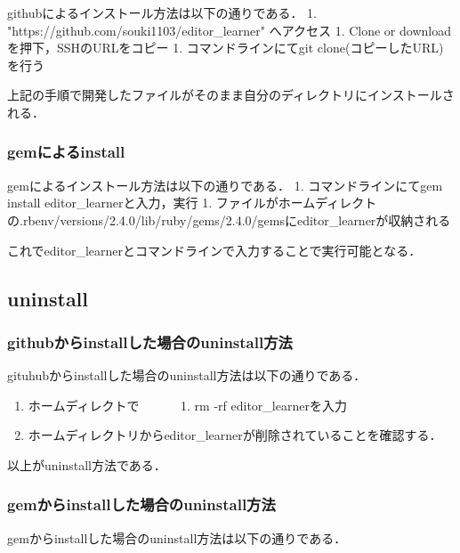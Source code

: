 \documentclass[11pt,dvipdfmx]{jsarticle}
\providecommand{\tightlist}{%
      \setlength{\itemsep}{0pt}\setlength{\parskip}{0pt}}
\begin{document}
githubによるインストール方法は以下の通りである． 1.
"https://github.com/souki1103/editor\_learner" へアクセス 1. Clone or
downloadを押下，SSHのURLをコピー 1. コマンドラインにてgit
clone(コピーしたURL)を行う

上記の手順で開発したファイルがそのまま自分のディレクトリにインストールされる．

\subsubsection{gemによるinstall}\label{gemux306bux3088ux308binstall}

gemによるインストール方法は以下の通りである． 1. コマンドラインにてgem
install editor\_learnerと入力，実行 1.
ファイルがホームディレクトの.rbenv/versions/2.4.0/lib/ruby/gems/2.4.0/gemsにeditor\_learnerが収納される

これでeditor\_learnerとコマンドラインで入力することで実行可能となる．

    \subsection{uninstall}\label{uninstall}

\subsubsection{githubからinstallした場合のuninstall方法}\label{githubux304bux3089installux3057ux305fux5834ux5408ux306euninstallux65b9ux6cd5}

gituhubからinstallした場合のuninstall方法は以下の通りである．

\begin{enumerate}
\def\labelenumi{\arabic{enumi}.}
\tightlist
\item
  ホームディレクトで 　　　1. rm -rf editor\_learnerを入力
\item
  ホームディレクトリからeditor\_learnerが削除されていることを確認する．
\end{enumerate}

以上がuninstall方法である．

\subsubsection{gemからinstallした場合のuninstall方法}\label{gemux304bux3089installux3057ux305fux5834ux5408ux306euninstallux65b9ux6cd5}

gemからinstallした場合のuninstall方法は以下の通りである．
\end{document}
